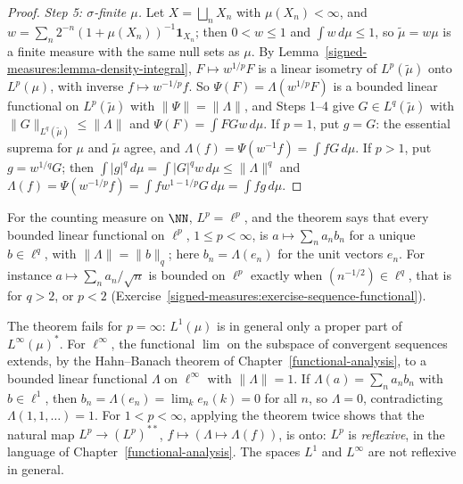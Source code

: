 \begin{proof}
\emph{Step 5: $\sigma$-finite $\mu$.} Let $X = \bigsqcup_nX_n$ with $\mu(X_n) < \infty$, and $w = \sum_n2^{-n}(1 + \mu(X_n))^{-1}\mathbf{1}_{X_n}$; then $0 < w \leq 1$ and $\int w\,d\mu \leq 1$, so
$\tilde\mu = w\mu$ is a finite measure with the same null sets as $\mu$. By Lemma~\ref{signed-measures:lemma-density-integral}, $F \mapsto w^{1/p}F$ is a linear isometry of $L^p(\tilde\mu)$ onto
$L^p(\mu)$, with inverse $f \mapsto w^{-1/p}f$. So $\Psi(F) = \Lambda(w^{1/p}F)$ is a bounded linear functional on $L^p(\tilde\mu)$ with $\|\Psi\| = \|\Lambda\|$, and Steps 1--4 give
$G \in L^q(\tilde\mu)$ with $\|G\|_{L^q(\tilde\mu)} \leq \|\Lambda\|$ and $\Psi(F) = \int FGw\,d\mu$. If $p = 1$, put $g = G$: the essential suprema for $\mu$ and $\tilde\mu$ agree, and
$\Lambda(f) = \Psi(w^{-1}f) = \int fG\,d\mu$. If $p > 1$, put $g = w^{1/q}G$; then $\int|g|^q\,d\mu = \int|G|^qw\,d\mu \leq \|\Lambda\|^q$ and
$\Lambda(f) = \Psi(w^{-1/p}f) = \int fw^{1 - 1/p}G\,d\mu = \int fg\,d\mu$.
\end{proof}

\begin{example}\label{signed-measures:example-sequence-duals}
For the counting measure on $\NN$, $L^p = \ell^p$, and the theorem says that every bounded linear functional on $\ell^p$, $1 \leq p < \infty$, is $a \mapsto \sum_na_nb_n$ for a unique
$b \in \ell^q$, with $\|\Lambda\| = \|b\|_q$; here $b_n = \Lambda(e_n)$ for the unit vectors $e_n$. For instance $a \mapsto \sum_na_n/\sqrt n$ is bounded on $\ell^p$ exactly when
$(n^{-1/2}) \in \ell^q$, that is for $q > 2$, or $p < 2$ (Exercise~\ref{signed-measures:exercise-sequence-functional}).
\end{example}

\begin{remark}\label{signed-measures:remark-linfty-dual}
The theorem fails for $p = \infty$: $L^1(\mu)$ is in general only a proper part of $L^\infty(\mu)^*$. For $\ell^\infty$, the functional $\lim$ on the subspace of convergent sequences extends, by the
Hahn--Banach theorem of Chapter~\ref{functional-analysis}, to a bounded linear functional $\Lambda$ on $\ell^\infty$ with $\|\Lambda\| = 1$. If $\Lambda(a) = \sum_na_nb_n$ with $b \in \ell^1$, then
$b_n = \Lambda(e_n) = \lim_ke_n(k) = 0$ for all $n$, so $\Lambda = 0$, contradicting $\Lambda(1, 1, \ldots) = 1$. For $1 < p < \infty$, applying the theorem twice shows that the natural map $L^p \to (L^p)^{**}$, $f \mapsto (\Lambda \mapsto \Lambda(f))$, is onto: $L^p$ is \emph{reflexive}, in the language
of Chapter~\ref{functional-analysis}. The spaces $L^1$ and $L^\infty$ are not reflexive in general.
\end{remark}

